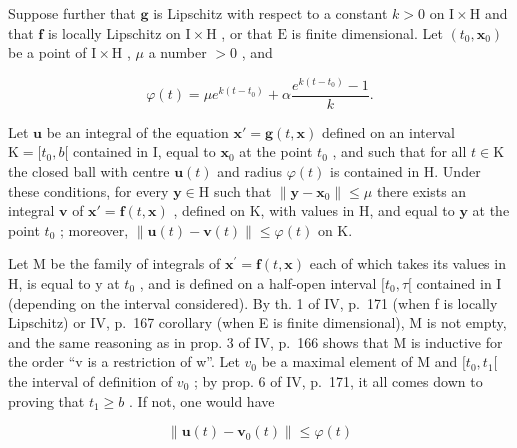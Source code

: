 Suppose further that \(\mathbf{g}\) is Lipschitz with respect to a constant \(k > 0\) on \(\mathrm{I} \times \mathrm{H}\) and that \(\mathbf{f}\) is locally Lipschitz on \(\mathrm{I} \times \mathrm{H}\) , or that \(\mathrm{E}\) is finite dimensional. Let \((t_0, \mathbf{x}_0)\) be a point of \(\mathrm{I} \times \mathrm{H}\) , \(\mu\) a number \(>0\) , and

\[
\varphi (t) = \mu e ^ {k (t - t _ {0})} + \alpha \frac {e ^ {k (t - t _ {0})} - 1}{k}.
\]

Let \(\mathbf{u}\) be an integral of the equation \(\mathbf{x}' = \mathbf{g}(t, \mathbf{x})\) defined on an interval \(\mathrm{K} = [t_0, b[\) contained in I, equal to \(\mathbf{x}_0\) at the point \(t_0\) , and such that for all \(t \in \mathrm{K}\) the closed ball with centre \(\mathbf{u}(t)\) and radius \(\varphi(t)\) is contained in H. Under these conditions, for every \(\mathbf{y} \in \mathrm{H}\) such that \(\| \mathbf{y} - \mathbf{x}_0 \| \leqslant \mu\) there exists an integral \(\mathbf{v}\) of \(\mathbf{x}' = \mathbf{f}(t, \mathbf{x})\) , defined on K, with values in H, and equal to \(\mathbf{y}\) at the point \(t_0\) ; moreover, \(\| \mathbf{u}(t) - \mathbf{v}(t) \| \leqslant \varphi(t)\) on K.

Let M be the family of integrals of \(\mathbf{x}^{\prime} = \mathbf{f}(t, \mathbf{x})\) each of which takes its values in H, is equal to y at \(t_{0}\) , and is defined on a half-open interval \([t_{0}, \tau[\) contained in I (depending on the interval considered). By th. 1 of IV, p.~171 (when f is locally Lipschitz) or IV, p.~167 corollary (when E is finite dimensional), M is not empty, and the same reasoning as in prop. 3 of IV, p.~166 shows that M is inductive for the order ``v is a restriction of w''. Let \(v_{0}\) be a maximal element of M and \([t_{0}, t_{1}[\) the interval of definition of \(v_{0}\) ; by prop. 6 of IV, p.~171, it all comes down to proving that \(t_{1} \geqslant b\) . If not, one would have

\[
\left\| \mathbf {u} (t) - \mathbf {v} _ {0} (t) \right\| \leqslant \varphi (t)
\]

